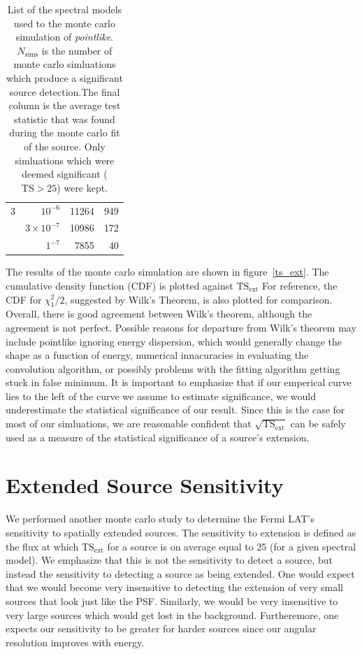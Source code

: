 \documentclass{emulateapj}
\begin{document}
\begin{table}
\begin{centering}
\begin{tabular}{ | r | r | r | r | }
\hline                                                
    3 &          $10^{-6}$ &           11264 &    949 \\
      &  $3\times 10^{-7}$ &           10986 &    172 \\
      &           $1^{-7}$ &            7855 &     40 \\
\hline
\end{tabular}
\caption{List of the spectral models used to the monte carlo simulation of
{\em pointlike}.$N_\text{sims}$ is the number of monte carlo simluations
which produce a significant source detection.The final column is the
average test statistic that was found during the monte carlo fit of
the source. Only simluations which were deemed significant ($\text{TS}>25$)
were kept.}
\label{ts_ext_num_sims}
  \end{centering}
\end{table}

The results of the monte carlo simulation are shown in
figure~\ref{ts_ext}.  The cumulative density function (CDF) is plotted
against $\text{TS}_\text{ext}$ For reference, the CDF for $\chi^2_1/2$,
suggested by Wilk's Theorem, is also plotted for comparison. Overall,
there is good agreement between Wilk's theorem, although the agreement
is not perfect.  Possible reasons for departure from Wilk's theorem may
include pointlike ignoring energy dispersion, which would generally change
the shape as a function of energy, numerical innacuracies in evaluating
the convolution algorithm, or possibly problems with the fitting algorithm
getting stuck in false minimum. It is important to emphasize that if
our emperical curve lies to the left of the curve we assume to estimate
significance, we would underestimate the statistical significance of
our result. Since this is the case for most of our simluations, we are
reasonable confident that $\sqrt{\text{TS}_\text{ext}}$ can be safely
used as a measure of the statistical significance of a source's extension.

\section{Extended Source Sensitivity}

We performed another monte carlo study to determine the Fermi LAT's
sensitivity to spatially extended sources. The sensitivity to extension
is defined as the flux at which $\text{TS}_\text{ext}$ for a source is on
average equal to 25 (for a given spectral model). We emphasize that this
is not the sensitivity to detect a source, but instead the sensitivity
to detecting a source as being extended.  One would expect that we would
become very insensitive to detecting the extension of very small sources
that look just like the PSF. Similarly, we would be very insensitive to
very large sources which would get lost in the background. Furtheremore,
one expects our sensitivity to be greater for harder sources since our
angular resolution improves with energy.
\end{document}
